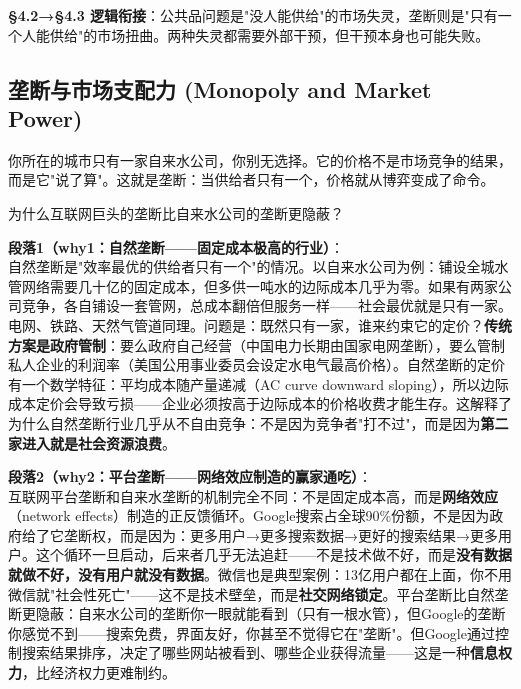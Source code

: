 \documentclass[../main.tex]{subfiles}
\begin{document}
	\textbf{§4.2→§4.3 逻辑衔接}：公共品问题是"没人能供给"的市场失灵，垄断则是"只有一个人能供给"的市场扭曲。两种失灵都需要外部干预，但干预本身也可能失败。

	\subsection{垄断与市场支配力 (Monopoly and Market Power)}
	\begin{motivation}
		你所在的城市只有一家自来水公司，你别无选择。它的价格不是市场竞争的结果，而是它"说了算"。这就是垄断：当供给者只有一个，价格就从博弈变成了命令。
	\end{motivation}
	\begin{questionbox}
		为什么互联网巨头的垄断比自来水公司的垄断更隐蔽？
	\end{questionbox}

	\textbf{段落1（why1：自然垄断——固定成本极高的行业）}：\\
	自然垄断是"效率最优的供给者只有一个"的情况。以自来水公司为例：铺设全城水管网络需要几十亿的固定成本，但多供一吨水的边际成本几乎为零。如果有两家公司竞争，各自铺设一套管网，总成本翻倍但服务一样——社会最优就是只有一家。电网、铁路、天然气管道同理。问题是：既然只有一家，谁来约束它的定价？\textbf{传统方案是政府管制}：要么政府自己经营（中国电力长期由国家电网垄断），要么管制私人企业的利润率（美国公用事业委员会设定水电气最高价格）。自然垄断的定价有一个数学特征：平均成本随产量递减（AC curve downward sloping），所以边际成本定价会导致亏损——企业必须按高于边际成本的价格收费才能生存。这解释了为什么自然垄断行业几乎从不自由竞争：不是因为竞争者"打不过"，而是因为\textbf{第二家进入就是社会资源浪费}。

	\textbf{段落2（why2：平台垄断——网络效应制造的赢家通吃）}：\\
	互联网平台垄断和自来水垄断的机制完全不同：不是固定成本高，而是\textbf{网络效应}（network effects）制造的正反馈循环。Google搜索占全球90\%份额，不是因为政府给了它垄断权，而是因为：更多用户→更多搜索数据→更好的搜索结果→更多用户。这个循环一旦启动，后来者几乎无法追赶——不是技术做不好，而是\textbf{没有数据就做不好，没有用户就没有数据}。微信也是典型案例：13亿用户都在上面，你不用微信就"社会性死亡"——这不是技术壁垒，而是\textbf{社交网络锁定}。平台垄断比自然垄断更隐蔽：自来水公司的垄断你一眼就能看到（只有一根水管），但Google的垄断你感觉不到——搜索免费，界面友好，你甚至不觉得它在"垄断"。但Google通过控制搜索结果排序，决定了哪些网站被看到、哪些企业获得流量——这是一种\textbf{信息权力}，比经济权力更难制约。
\end{document}
